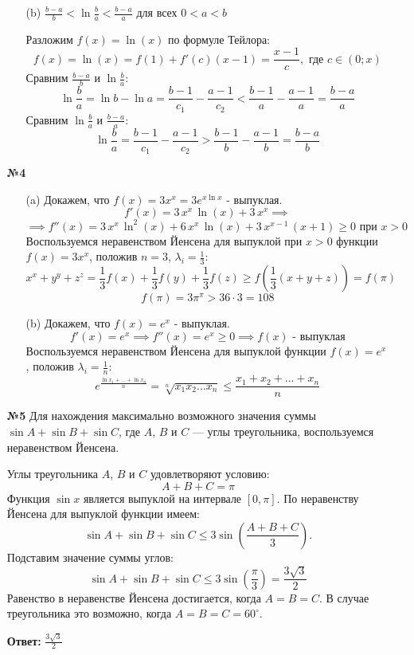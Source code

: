\documentclass[a4paper]{article}
\renewcommand{\f}[2]{\frac{#1}{#2}}
\renewcommand{\geq}{\geqslant}
\renewcommand{\leq}{\leqslant}
\begin{document}
\begin{enumerate}
\begin{enumerate}
        \item[(b)]$\f{b-a}{b} < \ln \f{b}{a} < \f{b-a}{a}$ для всех $0 < a < b$
        
        Разложим $f(x) = \ln(x)$ по формуле Тейлора:
        $$f(x) = \ln(x) = f(1) + f'(c)(x-1) = \f{x-1}{c}, \text{ где $c \in (0;x)$}$$
        Сравним $\f{b-a}{b}$ и $\ln \f{b}{a}$:
        $$\ln \f{b}{a} = \ln b - \ln a = \f{b-1}{c_1}-\f{a-1}{c_2} < \f{b-1}{a}-\f{a-1}{a} = \f{b-a}{a}$$
        Сравним $\ln \f{b}{a}$ и $\f{b-a}{a}$:
        $$\ln \f{b}{a} = \f{b-1}{c_1}-\f{a-1}{c_2} > \f{b-1}{b}-\f{a-1}{b} = \f{b-a}{b}$$
    \end{enumerate}

    \item[\textbf{№4}]\begin{enumerate}
        \item[(a)] Докажем, что $f(x) = 3x^x = 3e^{x\ln x}$ - выпуклая.
        $$f'(x) = 3\,{x}^{x}\,\ln\left(x\right)+3\,{x}^{x} \implies $$
        $$\implies f''(x) = 3\,{x}^{x}\,\ln^{2}\left(x\right)+6\,{x}^{x}\,\ln\left(x\right)+3\,{x}^{x-1}\,\left(x+1\right) \geq 0 \text{ при } x > 0 $$
        Воспользуемся неравенством Йенсена для выпуклой при $x>0$ функции $f(x) = 3x^x$, положив $n=3$, $\lambda_i = \f{1}{3}$:
        $$x^x+y^y+z^z = \f{1}{3}f(x)+\f{1}{3}f(y)+\f{1}{3}f(z) \geq f(\f{1}{3}(x+y+z)) = f(\pi)$$
        $$f(\pi)= 3\pi^\pi > 36 \cdot 3 = 108$$

        \item[(b)] Докажем, что $f(x) = e^x$ - выпуклая.
        $$f'(x) = e^x \implies f''(x) = e^x \geq 0 \implies f(x) \text{ - выпуклая}$$
        Воспользуемся неравенством Йенсена для выпуклой функции $f(x) = e^x$, положив $\lambda_i = \f{1}{n}$:
        $$e^{\f{\ln x_1 + \dots + \ln x_n}{n}} = \sqrt[n]{x_1 x_2 \dots x_n} \leq \f{x_1+x_2+\dots + x_n}{n}$$

    \end{enumerate}
    \item[\textbf{№5}]Для нахождения максимально возможного значения суммы $\sin A + \sin B + \sin C$, где $A$, $B$ и $C$ — углы треугольника, воспользуемся неравенством Йенсена.
    
    Углы треугольника $A$, $B$ и $C$ удовлетворяют условию:
    $$
    A + B + C = \pi
    $$
    Функция $\sin x$ является выпуклой на интервале $[0, \pi]$. По неравенству Йенсена для выпуклой функции имеем:
    $$
    \sin A + \sin B + \sin C \leq 3 \sin\left(\frac{A + B + C}{3}\right).
    $$
    Подставим значение суммы углов:
    $$
    \sin A + \sin B + \sin C \leq 3 \sin\left(\frac{\pi}{3}\right) = \frac{3\sqrt{3}}{2}
    $$
    Равенство в неравенстве Йенсена достигается, когда $A = B = C$. В случае треугольника это возможно, когда $A = B = C = 60^\circ$.

    \textbf{Ответ: } $\frac{3\sqrt{3}}{2}$
\end{enumerate}
\end{document}
